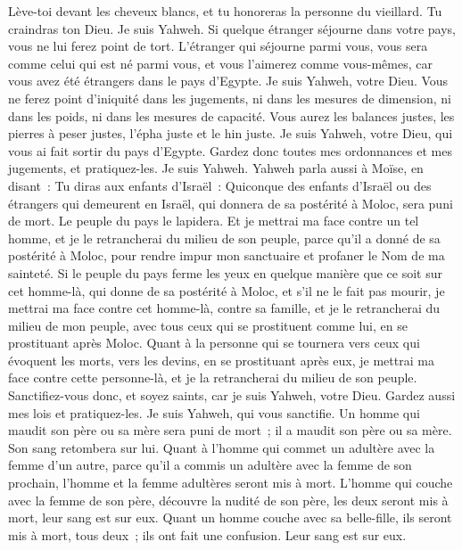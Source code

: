 \begin{multicols}{2}
Lève-toi devant les cheveux blancs, et tu honoreras la personne du vieillard. Tu craindras ton Dieu. Je suis Yahweh.
Si quelque étranger séjourne dans votre pays, vous ne lui ferez point de tort.
L'étranger qui séjourne parmi vous, vous sera comme celui qui est né parmi vous, et vous l'aimerez comme vous-mêmes, car vous avez été étrangers dans le pays d'Egypte. Je suis Yahweh, votre Dieu.
Vous ne ferez point d'iniquité dans les jugements, ni dans les mesures de dimension, ni dans les poids, ni dans les mesures de capacité.
Vous aurez les balances justes, les pierres à peser justes, l'épha juste et le hin juste. Je suis Yahweh, votre Dieu, qui vous ai fait sortir du pays d'Egypte.
Gardez donc toutes mes ordonnances et mes jugements, et pratiquez-les. Je suis Yahweh.
\VerseOne{}Yahweh parla aussi à Moïse, en disant~:
Tu diras aux enfants d'Israël~: Quiconque des enfants d'Israël ou des étrangers qui demeurent en Israël, qui donnera de sa postérité à Moloc, sera puni de mort. Le peuple du pays le lapidera.
Et je mettrai ma face contre un tel homme, et je le retrancherai du milieu de son peuple, parce qu'il a donné de sa postérité à Moloc, pour rendre impur mon sanctuaire et profaner le Nom de ma sainteté.
Si le peuple du pays ferme les yeux en quelque manière que ce soit sur cet homme-là, qui donne de sa postérité à Moloc, et s'il ne le fait pas mourir,
je mettrai ma face contre cet homme-là, contre sa famille, et je le retrancherai du milieu de mon peuple, avec tous ceux qui se prostituent comme lui, en se prostituant après Moloc.
Quant à la personne qui se tournera vers ceux qui évoquent les morts, vers les devins, en se prostituant après eux, je mettrai ma face contre cette personne-là, et je la retrancherai du milieu de son peuple.
Sanctifiez-vous donc, et soyez saints, car je suis Yahweh, votre Dieu.
Gardez aussi mes lois et pratiquez-les. Je suis Yahweh, qui vous sanctifie.
Un homme qui maudit son père ou sa mère sera puni de mort~; il a maudit son père ou sa mère. Son sang retombera sur lui.
Quant à l'homme qui commet un adultère avec la femme d'un autre, parce qu'il a commis un adultère avec la femme de son prochain, l'homme et la femme adultères seront mis à mort.
L'homme qui couche avec la femme de son père, découvre la nudité de son père, les deux seront mis à mort, leur sang est sur eux.
Quant un homme couche avec sa belle-fille, ils seront mis à mort, tous deux~; ils ont fait une confusion. Leur sang est sur eux.

\end{multicols}
